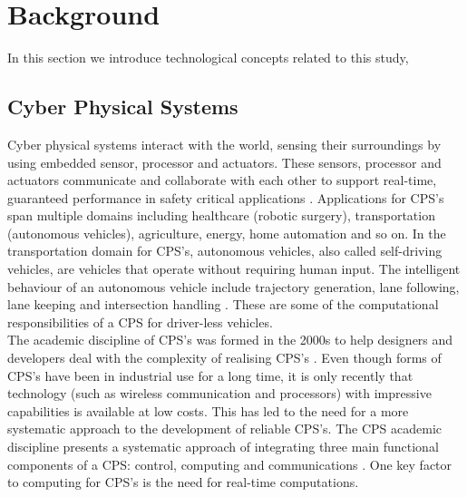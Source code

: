 
\chapter{Background} \label{sect:background} 
In this section we introduce technological concepts related to this study,
\section{Cyber Physical Systems}

Cyber physical systems interact with the world, sensing their surroundings by using embedded sensor, processor and actuators. These sensors, processor and actuators communicate and collaborate with each other to support real-time, guaranteed performance in safety critical applications \cite{sidcyber}. Applications for CPS's span multiple domains including healthcare (robotic surgery), transportation (autonomous vehicles), agriculture, energy, home automation and so on. In the transportation domain for CPS's, autonomous vehicles, also called self-driving vehicles, are vehicles that operate without requiring human input. The intelligent behaviour of an autonomous vehicle include trajectory generation, lane following, lane keeping and intersection handling \cite{sidcyber}. These are some of the computational responsibilities of a CPS for driver-less vehicles.\\ 

The academic discipline of CPS's was formed in the 2000s \cite{alur} to help designers and developers deal with the complexity of realising CPS's \cite{gonz}. Even though forms of CPS's have been in industrial use for a long time, it is only recently that technology (such as wireless communication and processors) with impressive capabilities is available at low costs. This has led to the need for a more systematic approach to the development of reliable CPS's. The CPS academic discipline presents a systematic approach of integrating three main functional components of a CPS: control, computing and communications \cite{alur}. One key factor to computing for CPS's is the need for real-time computations.\\

